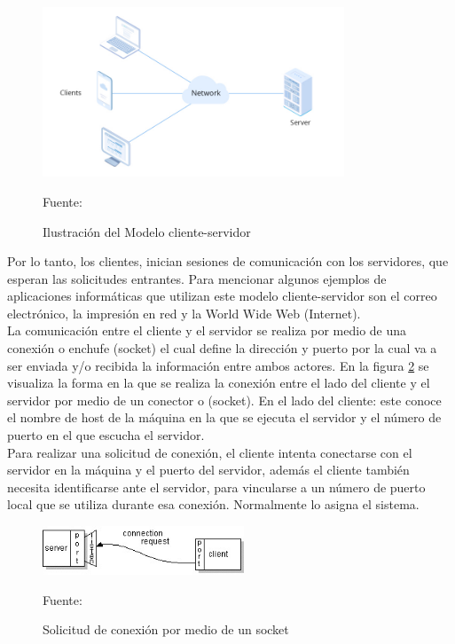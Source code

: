 \begin{figure}[H]
    \begin{center}
        \includegraphics[width=9cm]{img/capitulo_2/client-server.jpeg}
        \caption{Ilustración del Modelo cliente-servidor\\}
        Fuente: \cite{clientserver}
        \label{fig:client_server}
    \end{center}
\end{figure}

Por lo tanto, los clientes, inician sesiones de comunicación con los servidores, que esperan las solicitudes entrantes. Para mencionar algunos ejemplos de aplicaciones informáticas que utilizan este modelo cliente-servidor son el correo electrónico, la impresión en red y la World Wide Web (Internet).\\

La comunicación entre el cliente y el servidor se realiza por medio de una conexión o enchufe (socket) el cual define la dirección y puerto por la cual va a ser enviada y/o recibida la información entre ambos actores. En la figura \ref{fig:socket_request} se visualiza la forma en la que se realiza la conexión entre el lado del cliente y el servidor por medio de un conector o (socket). En el lado del cliente: este conoce el nombre de host de la máquina en la que se ejecuta el servidor y el número de puerto en el que escucha el servidor.\\

Para realizar una solicitud de conexión, el cliente intenta conectarse con el servidor en la máquina y el puerto del servidor, además el cliente también necesita identificarse ante el servidor, para vincularse a un número de puerto local que se utiliza durante esa conexión. Normalmente lo asigna el sistema.\\

\begin{figure}[H]
    \begin{center}
        \includegraphics[width=6cm]{img/capitulo_2/socket_request.jpg}
        \caption{Solicitud de conexión por medio de un socket\\}
        Fuente: \cite{socketconnection}
        \label{fig:socket_request}
    \end{center}
\end{figure}

